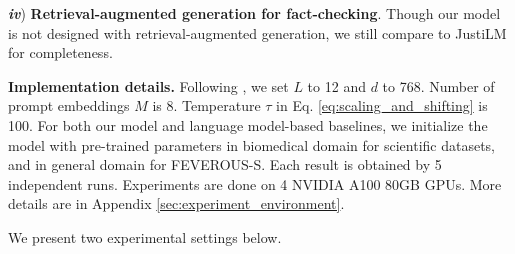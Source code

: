 \emph{\textbf{iv}}) \textbf{Retrieval-augmented generation for fact-checking}. Though our model is not designed with retrieval-augmented generation, we still compare to JustiLM \cite{justilm} for completeness.

\textbf{Implementation details.} Following \cite{transformer}, we set $ L $ to 12 and $ d $ to 768. Number of prompt embeddings $ M $ is 8. Temperature $ \tau $ in Eq. \ref{eq:scaling_and_shifting} is 100. For both our model and language model-based baselines, we initialize the model with pre-trained parameters in biomedical domain \cite{pubmedbert} for scientific datasets, and in general domain \cite{bert} for FEVEROUS-S. Each result is obtained by 5 independent runs. Experiments are done on 4 NVIDIA A100 80GB GPUs. More details are in Appendix \ref{sec:experiment_environment}.

We present two experimental settings below.

